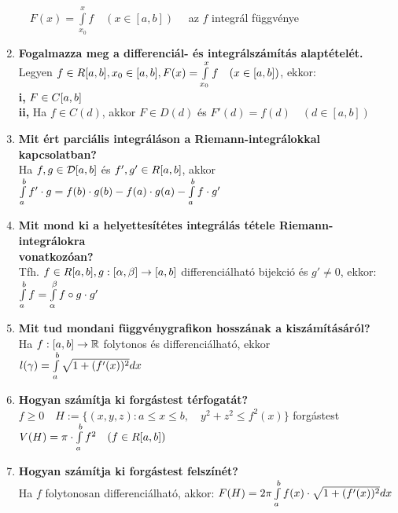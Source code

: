 \documentclass[a4paper,11pt]{article}
\begin{document}
\begin{enumerate}
	$\quad F(x)=\int\limits_{x_0}^xf\quad(x\in[a,b])\quad$ az $f$ integrál függvénye
	\item\textbf{Fogalmazza meg a differenciál- és integrálszámítás alaptételét.}
	\\[0.1cm]
	Legyen $f\in R[a,b],x_0\in[a,b],F(x)=\int\limits_{x_0}^xf\quad(x\in[a,b])$, ekkor:
	\\\textbf{i,} $F\in C[a,b]$\\[0.2cm]
	\textbf{ii,} Ha $f\in C(d)$, akkor $F\in D(d)$ és $F'(d)=f(d)\quad(d\in[a,b])$
	\item\textbf{Mit ért parciális integráláson a Riemann-integrálokkal kapcsolatban?}
	\\[0.1cm]
	Ha $f,g\in\mathcal{D}[a,b]$ és $f',g'\in R[a,b]$, akkor $\int\limits_{a}^{b} f'\cdot g=f(b)\cdot g(b)-
	f(a)\cdot g(a)-\int\limits_{a}^{b} f\cdot g'$
	\item\textbf{Mit mond ki a helyettesítétes integrálás tétele Riemann-integrálokra \\ vonatkozóan?}\\[0.1cm]
	Tfh. $f\in R[a,b],g:[\alpha,\beta]\to[a,b]$ differenciálható bijekció és $g'\neq0$,
	ekkor: $\int\limits_{a}^{b} f=\int\limits_{\alpha}^{\beta}f\circ g\cdot g'$
	\item\textbf{Mit tud mondani függvénygrafikon hosszának a kiszámításáról?}\\[0.1cm]
	Ha $f:[a,b]\to\mathbb{R}$ folytonos és differenciálható, ekkor $l(\gamma)=
	\int\limits_{a}^{b}\sqrt{1+(f'(x))^2}dx$
	\item\textbf{Hogyan számítja ki forgástest térfogatát?}\\[0.1cm]
	$f\geq0\quad H:=\{(x,y,z):a\leq x\leq b,\quad y^2+z^2\leq f^2(x)\}$
	forgástest\\$V(H)=\pi\cdot\int\limits_{a}^{b} f^2\quad(f\in R[a,b])$
	\item\textbf{Hogyan számítja ki forgástest felszínét?}\\[0.1cm]
	Ha $f$ folytonosan differenciálható, akkor:
	$F(H)=2\pi\int\limits_{a}^{b} f(x)\cdot\sqrt{1+(f'(x))^2}dx$
\end{enumerate}
\end{document}
